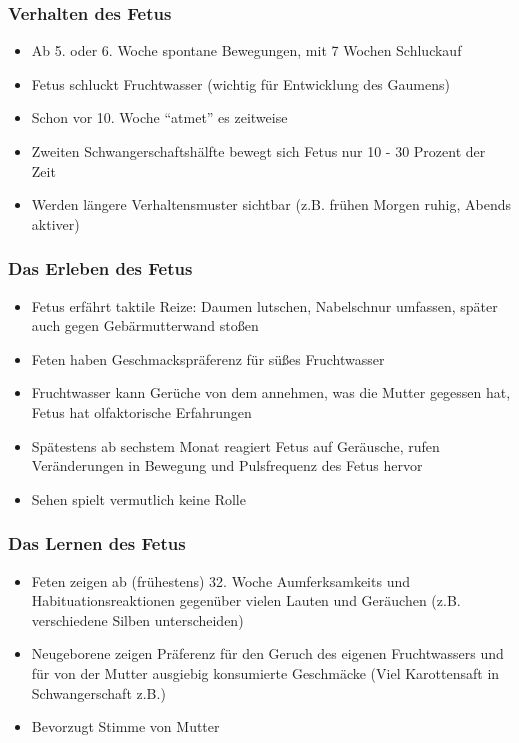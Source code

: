 \subsubsection{Verhalten des Fetus}
\begin{itemize}
	\item
		Ab 5. oder 6. Woche spontane Bewegungen, mit 7 Wochen Schluckauf
	\item
		Fetus schluckt Fruchtwasser (wichtig für Entwicklung des Gaumens)
	\item
		Schon vor 10. Woche \enquote{atmet} es zeitweise
	\item
		Zweiten Schwangerschaftshälfte bewegt sich Fetus nur 10 - 30 Prozent der Zeit
	\item
		Werden längere Verhaltensmuster sichtbar (z.B. frühen Morgen ruhig, Abends aktiver)
\end{itemize}

\subsubsection{Das Erleben des Fetus}
\begin{itemize}
	\item
		Fetus erfährt taktile Reize: Daumen lutschen, Nabelschnur umfassen, später auch gegen Gebärmutterwand stoßen
	\item
		Feten haben Geschmackspräferenz für süßes Fruchtwasser
	\item
		Fruchtwasser kann Gerüche von dem annehmen, was die Mutter gegessen hat, Fetus hat olfaktorische Erfahrungen
	\item
		Spätestens ab sechstem Monat reagiert Fetus auf Geräusche, rufen Veränderungen in Bewegung und Pulsfrequenz des Fetus hervor
	\item
		Sehen spielt vermutlich keine Rolle
\end{itemize}

\subsubsection{Das Lernen des Fetus}
\begin{itemize}
	\item
		Feten zeigen  ab (frühestens) 32. Woche Aumferksamkeits und Habituationsreaktionen gegenüber vielen Lauten und Geräuchen (z.B. verschiedene Silben unterscheiden)
	\item
		Neugeborene zeigen Präferenz für den Geruch des eigenen Fruchtwassers und für von der Mutter ausgiebig konsumierte Geschmäcke (Viel Karottensaft in Schwangerschaft z.B.)
	\item
		Bevorzugt Stimme von Mutter
\end{itemize}

